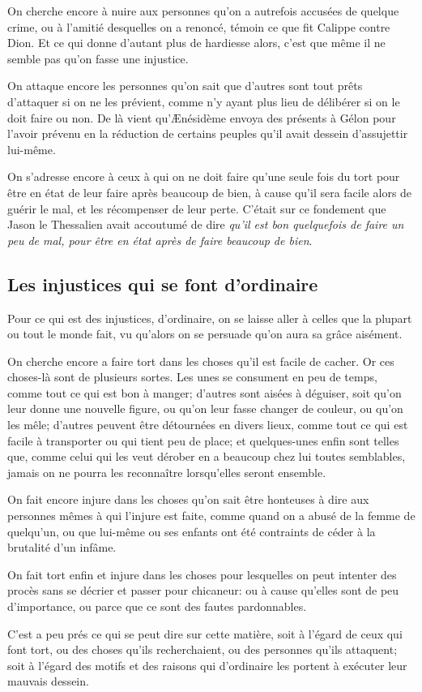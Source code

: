 On cherche encore à nuire aux personnes qu'on a autrefois accusées de quelque crime, ou à l’amitié desquelles
on a renoncé, témoin ce que fit Calippe contre Dion. Et ce qui donne d'autant plus de hardiesse alors, c'est
que même il ne semble pas qu'on fasse une injustice.

On attaque encore les personnes qu'on sait que d'autres sont tout prêts d'attaquer si on ne les prévient, comme n'y
ayant plus lieu de délibérer si on le doit faire ou non. De là vient qu'Ænésidème envoya des présents à Gélon pour
l'avoir prévenu en la réduction de certains peuples qu'il avait dessein d'assujettir lui-même.

On s'adresse encore à ceux à qui on ne doit faire qu'une seule fois du tort pour être en état de leur faire après
beaucoup de bien, à cause qu'il sera facile alors de guérir le mal, et les récompenser de leur perte. C'était sur
ce fondement que Jason le Thessalien avait accoutumé de dire \emph{qu'il est bon quelquefois de faire un peu de mal,
pour être en état après de faire beaucoup de bien}.

\subsection{Les injustices qui se font d'ordinaire}

Pour ce qui est des injustices, d'ordinaire, on se laisse aller à celles que la plupart ou tout le monde fait, vu
qu'alors on se persuade qu'on aura sa grâce aisément.

On cherche encore a faire tort dans les choses qu'il est facile de cacher. Or ces choses-là sont de plusieurs sortes.
Les unes se consument en peu de temps, comme tout ce qui est bon à manger; d'autres sont aisées à déguiser, soit
qu'on leur donne une nouvelle figure, ou qu'on leur fasse changer de couleur, ou qu'on les mêle; d'autres peuvent
être détournées en divers lieux, comme tout ce qui est facile à transporter ou qui tient peu de place; et quelques-unes
enfin sont telles que, comme celui qui les veut dérober en a beaucoup chez lui toutes semblables, jamais on ne
pourra les reconnaître lorsqu'elles seront ensemble. 

On fait encore injure dans les choses qu'on sait être honteuses à dire aux personnes mêmes à qui l'injure est faite,
comme quand on a abusé de la femme de quelqu'un, ou que lui-même ou ses enfants ont été contraints de céder à la
brutalité d'un infâme. 

On fait tort enfin et injure dans les choses pour lesquelles on peut intenter des procès sans se décrier et passer
pour chicaneur: ou à cause qu'elles sont de peu d'importance, ou parce que ce sont des fautes pardonnables. 

C'est a peu prés ce qui se peut dire sur cette matière, soit à l'égard de ceux qui font tort, ou des choses qu'ils
recherchaient, ou des personnes qu'ils attaquent; soit à l'égard des motifs et des raisons qui d'ordinaire les portent
à exécuter leur mauvais dessein.
